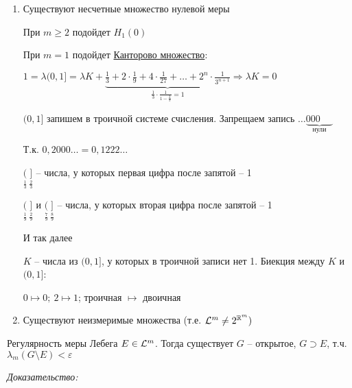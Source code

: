 \documentclass[12pt]{article}
\begin{document}
\begin{Remark}{}
    \begin{enumerate}
        \item Существуют несчетные множество нулевой меры
        
        При $m \geq 2$ подойдет $H_1(0)$

        При $m = 1$ подойдет \href{https://ru.wikipedia.org/wiki/%D0%9A%D0%B0%D0%BD%D1%82%D0%BE%D1%80%D0%BE%D0%B2%D0%BE_%D0%BC%D0%BD%D0%BE%D0%B6%D0%B5%D1%81%D1%82%D0%B2%D0%BE}{Канторово множество}: 
        
        $1 = \lambda (0, 1] = \lambda K + \underbrace{\frac{1}{3} + 2 \cdot \frac{1}{9} + 4 \cdot \frac{1}{27} + \ldots + 2^n \cdot \frac{1}{3^{n + 1}}}_{\frac{1}{3} \cdot \frac{1}{1 - \frac{2}{3}} = 1} \Rightarrow \lambda K = 0$

        $(0, 1]$ запишем в троичной системе счисления. Запрещаем запись $\ldots \underbrace{000\ \ \ \ \ \ }_\text{нули}$

        Т.к. $0, 2000\ldots = 0,1222\ldots$

        $\underset{\frac{1}{3}}{(}\ \underset{\frac{2}{3}}{]}$ -- числа, у которых первая цифра после запятой -- 1

        $\underset{\frac{1}{9}}{(}\ \underset{\frac{2}{9}}{]}$ и $\underset{\frac{7}{9}}{(}\ \underset{\frac{8}{9}}{]}$ -- числа, у которых вторая цифра после запятой -- 1

        И так далее 

        $K$ -- числа из $(0, 1]$, у которых в троичной записи нет 1. Биекция между $K$ и $(0, 1]$:
        
        $0 \mapsto 0;\ 2 \mapsto 1$; троичная $\mapsto$ двоичная

        \item Существуют неизмеримые множества (т.е. $\mathcal{L}^m \neq 2^{\mathbb R^m})$
    \end{enumerate}
\end{Remark}

\begin{theo}{Регулярность меры Лебега}
    $E \in \mathcal{L}^m$. Тогда существует $G$ -- открытое, $G \supset E$, т.ч. $\lambda_m (G \setminus E) < \varepsilon$
\end{theo}

\textit{Доказательство:}
\end{document}
